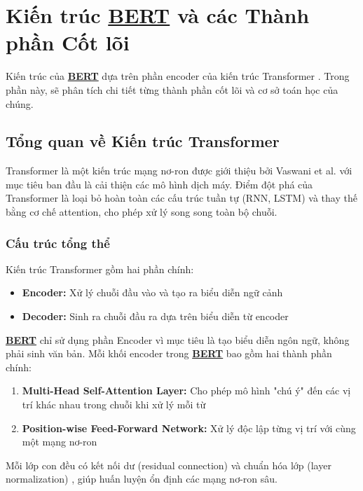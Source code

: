 \section{Kiến trúc \hyperref[acro:bert]{\textbf{BERT}} và các Thành phần Cốt lõi}
\label{sec:kien_truc_bert}

Kiến trúc của \hyperref[acro:bert]{\textbf{BERT}} dựa trên phần encoder của kiến trúc Transformer \cite{vaswani2017attention}. Trong phần này, sẽ phân tích chi tiết từng thành phần cốt lõi và cơ sở toán học của chúng.

\subsection{Tổng quan về Kiến trúc Transformer}
\label{ssec:tong_quan_transformer}

Transformer là một kiến trúc mạng nơ-ron được giới thiệu bởi Vaswani et al. \cite{vaswani2017attention} với mục tiêu ban đầu là cải thiện các mô hình dịch máy. Điểm đột phá của Transformer là loại bỏ hoàn toàn các cấu trúc tuần tự (RNN, LSTM) và thay thế bằng cơ chế attention, cho phép xử lý song song toàn bộ chuỗi.

\subsubsection{Cấu trúc tổng thể}
Kiến trúc Transformer gồm hai phần chính:
\begin{itemize}
    \item \textbf{Encoder:} Xử lý chuỗi đầu vào và tạo ra biểu diễn ngữ cảnh
    \item \textbf{Decoder:} Sinh ra chuỗi đầu ra dựa trên biểu diễn từ encoder
\end{itemize}

\hyperref[acro:bert]{\textbf{BERT}} chỉ sử dụng phần Encoder vì mục tiêu là tạo biểu diễn ngôn ngữ, không phải sinh văn bản. Mỗi khối encoder trong \hyperref[acro:bert]{\textbf{BERT}} bao gồm hai thành phần chính:

\begin{enumerate}
    \item \textbf{Multi-Head Self-Attention Layer:} Cho phép mô hình "chú ý" đến các vị trí khác nhau trong chuỗi khi xử lý mỗi từ
    \item \textbf{Position-wise Feed-Forward Network:} Xử lý độc lập từng vị trí với cùng một mạng nơ-ron
\end{enumerate}

Mỗi lớp con đều có kết nối dư (residual connection) và chuẩn hóa lớp (layer normalization) \cite{ba2016layer}, giúp huấn luyện ổn định các mạng nơ-ron sâu.

